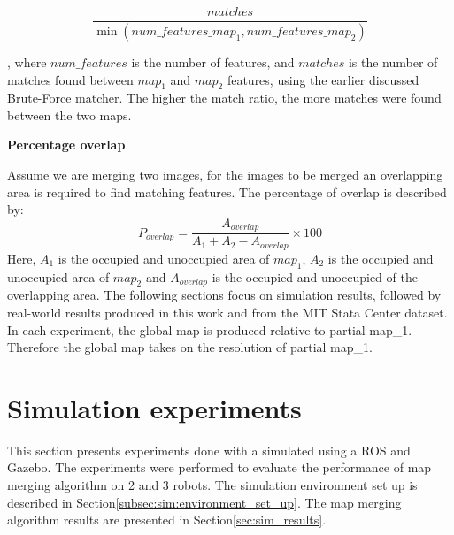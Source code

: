 \begin{equation}
    \frac{matches}{\min(num\_features\_map_1, num\_features\_map_2)}
    \label{eg:match_ratio}
\end{equation}

, where $num\_features$ is the number of features, and $matches$ is the number of matches found between $map_1$ and $map_2$ features, using the earlier discussed Brute-Force matcher. The higher the match ratio, the more matches were found between the two maps. 


\textbf{Percentage overlap}

Assume we are merging two images, for the images to be merged an overlapping area is required to find matching features. The percentage of overlap is described by:
\begin{equation}
    P_{overlap} = \frac{A_{overlap}}{A_{1} + A_{2} - A_{overlap}} \times 100
\end{equation} 
Here, $A_1$ is the occupied and unoccupied area of $map_1$, $A_2$ is the occupied and unoccupied area of $map_2$ and $A_{overlap}$ is the occupied and unoccupied of the overlapping area.
The following sections focus on simulation results, followed by real-world results produced in this work and from the MIT Stata Center dataset\cite{doi:10.1177/0278364913509035}. In each experiment, the global map is produced relative to partial map\_1. Therefore the global map takes on the resolution of partial map\_1. 


\section{Simulation experiments}
\label{subsec:ch4.section1.subsec1}
This section presents experiments done with a simulated using a ROS and Gazebo. The experiments were performed to evaluate the performance of map merging algorithm on 2 and 3 robots. The simulation environment set up is described in Section\ref{subsec:sim:environment_set_up}. The map merging algorithm results are presented in Section\ref{sec:sim_results}.

